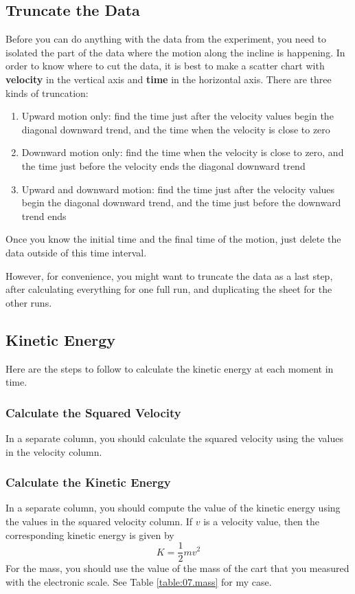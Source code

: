 \subsection{Truncate the Data}
%
Before you can do anything with the data from the experiment, you need to isolated the part of the data where the motion along the incline is happening. In order to know where to cut the data, it is best to make a scatter chart with \textbf{velocity} in the vertical axis and \textbf{time} in the horizontal axis. There are three kinds of truncation:
\begin{enumerate}
    \item Upward motion only: find the time just after the velocity values begin the diagonal downward trend, and the time when the velocity is close to zero
    \item Downward motion only: find the time when the velocity is close to zero, and the time just before the velocity ends the diagonal downward trend
    \item Upward and downward motion: find the time just after the velocity values begin the diagonal downward trend, and the time just before the downward trend ends
\end{enumerate}
Once you know the initial time and the final time of the motion, just delete the data outside of this time interval.

However, for convenience, you might want to truncate the data as a last step, after calculating everything for one full run, and duplicating the sheet for the other runs.
%
\subsection{Kinetic Energy}
%
Here are the steps to follow to calculate the kinetic energy at each moment in time.
%
\subsubsection{Calculate the Squared Velocity}
%
In a separate column, you should calculate the squared velocity using the values in the velocity column.
%
\subsubsection{Calculate the Kinetic Energy}
%
In a separate column, you should compute the value of the kinetic energy using the values in the squared velocity column. If $v$ is a velocity value, then the corresponding kinetic energy is given by
\begin{equation}
    K = \frac{1}{2} m v^{2}
\end{equation}
For the mass, you should use the value of the mass of the cart that you measured with the electronic scale. See Table \ref{table:07.mass} for my case.
%
